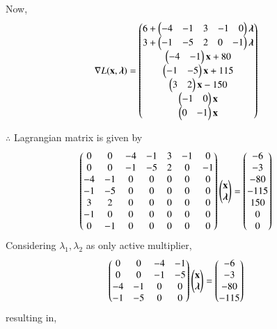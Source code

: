\documentclass[journal,12pt,twocolumn]{IEEEtran}
\begin{document}
Now,
\begin{align}
    \nabla L(\mathbf{x},\boldsymbol{\lambda}) &= \begin{pmatrix}6+ \begin{pmatrix}-4 & -1 & 3 & -1 & 0 \end{pmatrix}\boldsymbol{\lambda}\\ 3+\begin{pmatrix}-1 & -5 & 2 & 0 & -1\end{pmatrix}\boldsymbol{\lambda} \\ \begin{pmatrix}-4 & -1\end{pmatrix}\mathbf{x}+80 \\ \begin{pmatrix}-1 & -5\end{pmatrix}\mathbf{x}+115 \\ \begin{pmatrix}3 & 2\end{pmatrix}\mathbf{x}-150 \\ \begin{pmatrix}-1 & 0\end{pmatrix}\mathbf{x} \\ \begin{pmatrix}0 & -1\end{pmatrix}\mathbf{x}\end{pmatrix}
\end{align}

$\therefore$ Lagrangian matrix is given by
\begin{align}
    \begin{pmatrix}0 & 0 & -4 & -1 & 3 & -1 & 0 \\ 0 & 0 & -1 & -5 & 2 & 0 & -1 \\ -4 & -1 & 0 & 0 & 0 & 0 & 0 \\ -1 & -5 & 0 & 0 & 0 & 0 & 0 \\ 3 & 2 & 0 & 0 & 0 & 0 & 0 \\ -1 & 0 & 0 & 0 & 0 & 0 & 0 \\ 0 & -1 & 0 & 0 & 0 & 0 & 0 \end{pmatrix}\begin{pmatrix}\mathbf{x} \\ \boldsymbol{\lambda} \end{pmatrix} &= \begin{pmatrix}-6 \\ -3 \\ -80 \\ -115 \\ 150 \\ 0 \\0 \end{pmatrix}
\end{align}
Considering $\lambda_1,\lambda_2$ as only active multiplier,
\begin{align}
    \begin{pmatrix}0 & 0 & -4 & -1 \\ 0 & 0 & -1 & -5 \\ -4 & -1 & 0 & 0 \\ -1 & -5 & 0 & 0\end{pmatrix}\begin{pmatrix}\mathbf{x}\\ \boldsymbol{\lambda}\end{pmatrix} &= \begin{pmatrix}-6 \\ -3 \\ -80 \\ -115\end{pmatrix}
\end{align}
resulting in,
\end{document}
